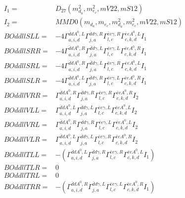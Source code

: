 \documentclass[A4,landscape]{article}
\begin{document}
\begin{align} 
I_1 = & D_{27}(m^2_{d_{{a}}}, m^2_{e_{{c}}}, mV22, mS12) \\ 
I_2 = & MMD0(m_{d_{{a}}}, m_{e_{{c}}}, m^2_{d_{{a}}}, m^2_{e_{{c}}}, mV22, mS12) \\ 
  BOddllSLL= & -4  \Gamma^{\bar{d}d A^0 ,L}_{a, i, d} \Gamma^{\bar{d}d \gamma ,R}_{j, a} \Gamma^{\bar{e}e \gamma ,R}_{l, c} \Gamma^{\bar{e}e A^0 ,L}_{c, k, d} I_1 \\ 
  BOddllSRR= & -4  \Gamma^{\bar{d}d A^0 ,R}_{a, i, d} \Gamma^{\bar{d}d \gamma ,L}_{j, a} \Gamma^{\bar{e}e \gamma ,L}_{l, c} \Gamma^{\bar{e}e A^0 ,R}_{c, k, d} I_1 \\ 
  BOddllSRL= & -4  \Gamma^{\bar{d}d A^0 ,R}_{a, i, d} \Gamma^{\bar{d}d \gamma ,L}_{j, a} \Gamma^{\bar{e}e \gamma ,R}_{l, c} \Gamma^{\bar{e}e A^0 ,L}_{c, k, d} I_1 \\ 
  BOddllSLR= & -4  \Gamma^{\bar{d}d A^0 ,L}_{a, i, d} \Gamma^{\bar{d}d \gamma ,R}_{j, a} \Gamma^{\bar{e}e \gamma ,L}_{l, c} \Gamma^{\bar{e}e A^0 ,R}_{c, k, d} I_1 \\ 
  BOddllVRR= &  \Gamma^{\bar{d}d A^0 ,R}_{a, i, d} \Gamma^{\bar{d}d \gamma ,R}_{j, a} \Gamma^{\bar{e}e \gamma ,R}_{l, c} \Gamma^{\bar{e}e A^0 ,R}_{c, k, d} I_2 \\ 
  BOddllVLL= &  \Gamma^{\bar{d}d A^0 ,L}_{a, i, d} \Gamma^{\bar{d}d \gamma ,L}_{j, a} \Gamma^{\bar{e}e \gamma ,L}_{l, c} \Gamma^{\bar{e}e A^0 ,L}_{c, k, d} I_2 \\ 
  BOddllVRL= &  \Gamma^{\bar{d}d A^0 ,R}_{a, i, d} \Gamma^{\bar{d}d \gamma ,R}_{j, a} \Gamma^{\bar{e}e \gamma ,L}_{l, c} \Gamma^{\bar{e}e A^0 ,L}_{c, k, d} I_2 \\ 
  BOddllVLR= &  \Gamma^{\bar{d}d A^0 ,L}_{a, i, d} \Gamma^{\bar{d}d \gamma ,L}_{j, a} \Gamma^{\bar{e}e \gamma ,R}_{l, c} \Gamma^{\bar{e}e A^0 ,R}_{c, k, d} I_2 \\ 
  BOddllTLL= & -( \Gamma^{\bar{d}d A^0 ,L}_{a, i, d} \Gamma^{\bar{d}d \gamma ,R}_{j, a} \Gamma^{\bar{e}e \gamma ,R}_{l, c} \Gamma^{\bar{e}e A^0 ,L}_{c, k, d} I_1) \\ 
  BOddllTLR= & 0 \\ 
  BOddllTRL= & 0 \\ 
  BOddllTRR= & -( \Gamma^{\bar{d}d A^0 ,R}_{a, i, d} \Gamma^{\bar{d}d \gamma ,L}_{j, a} \Gamma^{\bar{e}e \gamma ,L}_{l, c} \Gamma^{\bar{e}e A^0 ,R}_{c, k, d} I_1) \\ 
\end{align} 
\end{document}
